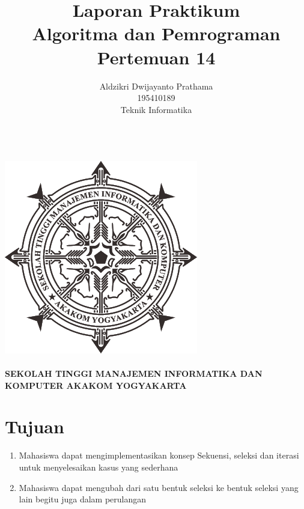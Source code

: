 \documentclass[a4paper,12pt]{article}
\begin{document}
\title{ {\Large Laporan Praktikum}\\ Algoritma dan Pemrograman \\{\Large Pertemuan 14}}

\author{Aldzikri Dwijayanto Prathama 
	\\195410189
	\\Teknik Informatika}
\makeatletter
\begin{titlepage}
	\begin{center}
		{\huge \bfseries \@title }\\[14ex]
		\includegraphics[scale=.8]{logo}\\[4ex]
		{\large \@author}\\[19ex]
		{\large \bfseries {SEKOLAH TINGGI MANAJEMEN INFORMATIKA DAN KOMPUTER
				AKAKOM YOGYAKARTA}}
	\end{center}


\end{titlepage}
\makeatother
\newpage
\tableofcontents
\newpage

\section{Tujuan}
\begin{enumerate}
    \item Mahasiswa dapat mengimplementasikan konsep Sekuensi, seleksi dan iterasi untuk menyelesaikan kasus yang sederhana
    \item Mahasiswa dapat mengubah dari satu bentuk seleksi ke bentuk seleksi yang lain begitu juga dalam perulangan
\end{enumerate}
\end{document}
